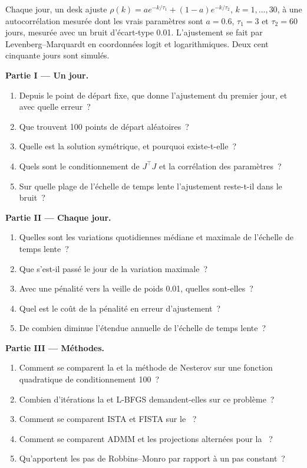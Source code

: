 \begin{problem}\label{pb:qm:numerical-optimisation-in-practice:1}
Chaque jour, un desk ajuste $\rho(k) = a e^{-k/\tau_1} + (1 - a)e^{-k/\tau_2}$, $k = 1, \dots, 30$, à une autocorrélation mesurée dont les vrais paramètres sont $a = 0.6$, $\tau_1 = 3$ et $\tau_2 = 60$ jours, mesurée
avec un bruit d'écart-type 0.01. L'ajustement se fait par Levenberg--Marquardt en coordonnées logit et logarithmiques. Deux cent cinquante jours sont simulés.

\medskip\noindent\textbf{Partie I --- Un jour.}
\begin{enumerate}
\item Depuis le point de départ fixe, que donne l'ajustement du premier jour, et avec quelle erreur~?
\item Que trouvent 100 points de départ aléatoires~?
\item Quelle est la solution symétrique, et pourquoi existe-t-elle~?
\item Quels sont le conditionnement de $J^\top J$ et la corrélation des paramètres~?
\item Sur quelle plage de l'échelle de temps lente l'ajustement reste-t-il dans le bruit~?
\end{enumerate}

\medskip\noindent\textbf{Partie II --- Chaque jour.}
\begin{enumerate}[resume]
\item Quelles sont les variations quotidiennes médiane et maximale de l'échelle de temps lente~?
\item Que s'est-il passé le jour de la variation maximale~?
\item Avec une pénalité vers la veille de poids 0.01, quelles sont-elles~?
\item Quel est le coût de la pénalité en erreur d'ajustement~?
\item De combien diminue l'étendue annuelle de l'échelle de temps lente~?
\end{enumerate}

\medskip\noindent\textbf{Partie III --- Méthodes.}
\begin{enumerate}[resume]
\item Comment se comparent la  et la méthode de Nesterov sur une fonction quadratique de conditionnement 100~?
\item Combien d'itérations la  et L-BFGS demandent-elles sur ce problème~?
\item Comment se comparent ISTA et FISTA sur le ~?
\item Comment se comparent ADMM et les projections alternées pour la ~?
\item Qu'apportent les pas de Robbins--Monro par rapport à un pas constant~?
\end{enumerate}


\end{problem}
